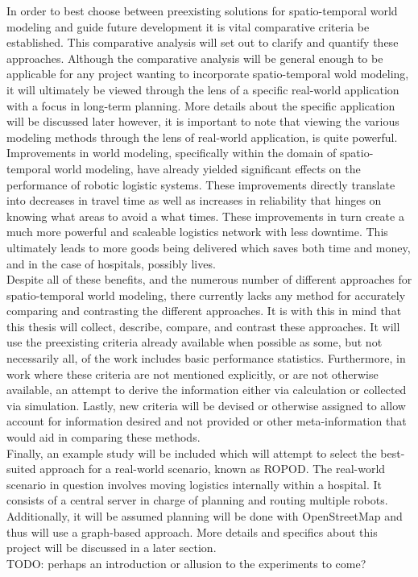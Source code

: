   In order to best choose between preexisting solutions for spatio-temporal
  world modeling and guide future development it is vital comparative criteria be
  established. This comparative analysis will set out to clarify and quantify
  these approaches. Although the comparative analysis will be general enough to be
  applicable for any project wanting to incorporate spatio-temporal wold modeling,
  it will ultimately be viewed through the lens of a specific real-world application
  with a focus in long-term planning. More details about the specific application
  will be discussed later however, it is important to note that viewing the
  various modeling methods through the lens of real-world application, is quite
  powerful. \\

  Improvements in world modeling, specifically within the domain of
  spatio-temporal world modeling, have already yielded significant effects
  on the performance of robotic logistic systems. These improvements directly
  translate into decreases in travel time as well as increases in reliability
  that hinges on knowing what areas to avoid a what times. These improvements in
  turn create a much more powerful and scaleable logistics network with less
  downtime. This ultimately leads to more goods being delivered which saves
  both time and money, and in the case of hospitals, possibly lives. \\

  Despite all of these benefits, and the numerous number of different approaches
  for spatio-temporal world modeling, there currently lacks any method for
  accurately comparing and contrasting the different approaches. It is with this
  in mind that this thesis will collect, describe, compare, and contrast these
  approaches.  It will use the preexisting criteria already available when possible as some,
  but not necessarily all, of the work includes basic performance statistics.
  Furthermore, in work where these criteria are not mentioned explicitly, or are
  not otherwise available, an attempt to derive the information either via
  calculation or collected via simulation. Lastly, new criteria will be devised
  or otherwise assigned to allow account for information desired and not provided
  or other meta-information that would aid in comparing these methods. \\

  Finally, an example study will be included which will attempt to select the
  best-suited approach for a real-world scenario, known as ROPOD. The real-world
  scenario in question involves moving logistics internally within a hospital.
  It consists of a central server in charge of planning and routing multiple
  robots.  Additionally, it will be assumed planning will be done with
  OpenStreetMap and thus will use a graph-based approach. More details and
  specifics about this project will be discussed in a later section. \\


  TODO: perhaps an introduction or allusion to the experiments to come?


